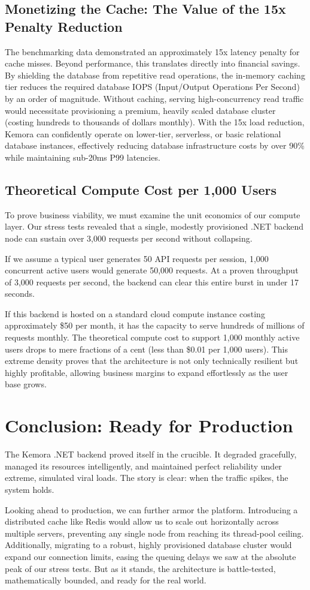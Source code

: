 \subsection{Monetizing the Cache: The Value of the 15x Penalty Reduction}
The benchmarking data demonstrated an approximately 15x latency penalty for cache misses. Beyond performance, this translates directly into financial savings. By shielding the database from repetitive read operations, the in-memory caching tier reduces the required database IOPS (Input/Output Operations Per Second) by an order of magnitude. Without caching, serving high-concurrency read traffic would necessitate provisioning a premium, heavily scaled database cluster (costing hundreds to thousands of dollars monthly). With the 15x load reduction, Kemora can confidently operate on lower-tier, serverless, or basic relational database instances, effectively reducing database infrastructure costs by over 90\% while maintaining sub-20ms P99 latencies.

\subsection{Theoretical Compute Cost per 1,000 Users}
To prove business viability, we must examine the unit economics of our compute layer. Our stress tests revealed that a single, modestly provisioned .NET backend node can sustain over 3,000 requests per second without collapsing. 

If we assume a typical user generates 50 API requests per session, 1,000 concurrent active users would generate 50,000 requests. At a proven throughput of 3,000 requests per second, the backend can clear this entire burst in under 17 seconds. 

If this backend is hosted on a standard cloud compute instance costing approximately \$50 per month, it has the capacity to serve hundreds of millions of requests monthly. The theoretical compute cost to support 1,000 monthly active users drops to mere fractions of a cent (less than \$0.01 per 1,000 users). This extreme density proves that the architecture is not only technically resilient but highly profitable, allowing business margins to expand effortlessly as the user base grows.

\section{Conclusion: Ready for Production}
The Kemora .NET backend proved itself in the crucible. It degraded gracefully, managed its resources intelligently, and maintained perfect reliability under extreme, simulated viral loads. The story is clear: when the traffic spikes, the system holds.

Looking ahead to production, we can further armor the platform. Introducing a distributed cache like Redis would allow us to scale out horizontally across multiple servers, preventing any single node from reaching its thread-pool ceiling. Additionally, migrating to a robust, highly provisioned database cluster would expand our connection limits, easing the queuing delays we saw at the absolute peak of our stress tests. But as it stands, the architecture is battle-tested, mathematically bounded, and ready for the real world.

